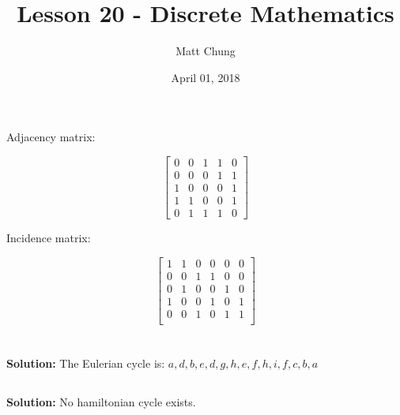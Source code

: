 \documentclass{article}
\title{Lesson 20 - Discrete Mathematics}
\author{Matt Chung}
\date{April 01, 2018}
\begin{document}
\maketitle

\section{}

Adjacency matrix:

\[
\begin{bmatrix}
    0 & 0 & 1 & 1 & 0 \\
    0 & 0 & 0 & 1 & 1 \\
    1 & 0 & 0 & 0 & 1 \\
    1 & 1 & 0 & 0 & 1 \\
    0 & 1 & 1 & 1 & 0
\end{bmatrix}
\]

Incidence matrix:

\[
\begin{bmatrix}
    1 & 1 & 0 & 0 & 0 & 0 \\
    0 & 0 & 1 & 1 & 0 & 0 \\
    0 & 1 & 0 & 0 & 1 & 0 \\
    1 & 0 & 0 & 1 & 0 & 1 \\
    0 & 0 & 1 & 0 & 1 & 1 \\
\end{bmatrix}
\]

\section{}

\subsection{}

\textbf{Solution:} The Eulerian cycle is: $a, d, b, e, d, g, h, e, f, h, i, f, c, b, a$

\subsection{}

\textbf{Solution: } No hamiltonian cycle exists.
\end{document}
